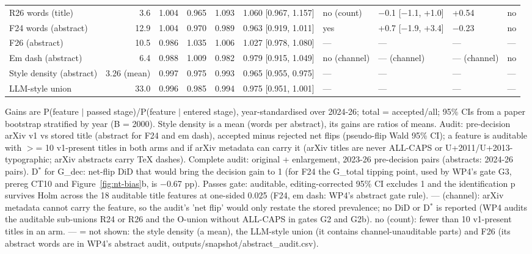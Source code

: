 \begin{landscape}
\begin{table}[p]
\begin{adjustbox}{max width=\linewidth}
\begin{tabular}{l r r r r l l l l l}
R26 words (title) & 3.6 & 1.004 & 0.965 & 1.093 & 1.060 [0.967, 1.157] & no (count) & $-$0.1 [$-$1.1, +1.0] & +0.54 & no \\
F24 words (abstract) & 12.9 & 1.004 & 0.970 & 0.989 & 0.963 [0.919, 1.011] & yes & +0.7 [$-$1.9, +3.4] & $-$0.23 & no \\
F26 (abstract) & 10.5 & 0.986 & 1.035 & 1.006 & 1.027 [0.978, 1.080] & --- & --- & --- & --- \\
Em dash (abstract) & 6.4 & 0.988 & 1.009 & 0.982 & 0.979 [0.915, 1.049] & no (channel) & --- (channel) & --- (channel) & no \\
Style density (abstract) & 3.26 (mean) & 0.997 & 0.975 & 0.993 & 0.965 [0.955, 0.975] & --- & --- & --- & --- \\
LLM-style union & 33.0 & 0.996 & 0.985 & 0.994 & 0.975 [0.951, 1.001] & --- & --- & --- & --- \\
\bottomrule
\end{tabular}
\end{adjustbox}
\par\smallskip
\parbox{\linewidth}{\scriptsize Gains are P(feature $|$ passed stage)/P(feature $|$ entered stage), year-standardised over 2024-26; total = accepted/all; 95\% CIs from a paper bootstrap stratified by year (B = 2000). Style density is a mean (words per abstract), its gains are ratios of means. Audit: pre-decision arXiv v1 vs stored title (abstract for F24 and em dash), accepted minus rejected net flips (pseudo-flip Wald 95\% CI); a feature is auditable with $>$= 10 v1-present titles in both arms and if arXiv metadata can carry it (arXiv titles are never ALL-CAPS or U+2011/U+2013-typographic; arXiv abstracts carry TeX dashes). Complete audit: original + enlargement, 2023-26 pre-decision pairs (abstracts: 2024-26 pairs). D$^{*}$ for G\_dec: net-flip DiD that would bring the decision gain to 1 (for F24 the G\_total tipping point, used by WP4's gate G3, prereg CT10 and Figure~\ref{fig:nt-bias}b, is $-$0.67 pp). Passes gate: auditable, editing-corrected 95\% CI excludes 1 and the identification p survives Holm across the 18 auditable title features at one-sided 0.025 (F24, em dash: WP4's abstract gate rule). --- (channel): arXiv metadata cannot carry the feature, so the audit's 'net flip' would only restate the stored prevalence; no DiD or D$^{*}$ is reported (WP4 audits the auditable sub-unions R24 or R26 and the O-union without ALL-CAPS in gates G2 and G2b). no (count): fewer than 10 v1-present titles in an arm. --- = not shown: the style density (a mean), the LLM-style union (it contains channel-unauditable parts) and F26 (its abstract words are in WP4's abstract audit, outputs/snapshot/abstract\_audit.csv).}
\end{table}
\end{landscape}
